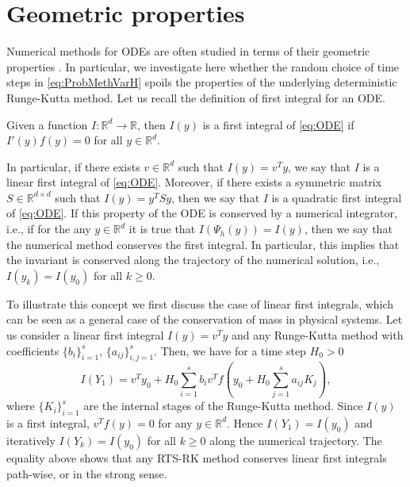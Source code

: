 \documentclass{siamart1116}
\numberwithin{theorem}{section}
\newcommand{\R}{\mathbb{R}}
\newcommand{\sksum}{{\textstyle\sum}}
\newcommand{\corr}[1]{{\color{bordeaux}#1}}
\begin{document}
\section{Geometric properties}\label{sec:GeomProperties}
Numerical methods for ODEs are often studied in terms of their geometric properties \cite{HLW06}. In particular, we investigate here whether the random choice of time steps in \eqref{eq:ProbMethVarH} spoils the properties of the underlying deterministic Runge-Kutta method. Let us recall the definition of first integral for an ODE.
\begin{definition} Given a function $I\colon\R^d\to\R$, then $I(y)$ is a first integral of \eqref{eq:ODE} if $I'(y)f(y) = 0$ for all $y \in \R^d$. 
\end{definition}	
\corr{In particular, if there exists $v \in \R^d$ such that $I(y) = v^Ty$, we say that $I$ is a linear first integral of \eqref{eq:ODE}. Moreover, if there exists a symmetric matrix $S \in \R^{d\times d}$ such that $I(y) = y^TSy$, then we say that $I$ is a quadratic first integral of \eqref{eq:ODE}.} If this property of the ODE is conserved by a numerical integrator, i.e., if for the any $y\in\R^d$ it is true that $I(\Psi_h(y)) = I(y)$, then we say that the numerical method conserves the first integral. In particular, this implies that the invariant is conserved along the trajectory of the numerical solution, i.e., $I(y_k) = I(y_0)$ for all $k\geq 0$.
	
\corr{\begin{example} To illustrate this concept we first discuss the case of linear first integrals, which can be seen as a general case of the conservation of mass in physical systems. Let us consider a linear first integral $I(y) = v^T y$ and any Runge-Kutta method with coefficients $\{b_i\}_{i=1}^s$, $\{a_{ij}\}_{i,j=1}^s$. Then, we have for a time step $H_0 > 0$
	\begin{equation}
		I(Y_1) = v^T y_0 + H_0 \sksum_{i=1}^s b_iv^T f(y_0 + H_0\sksum_{j=1}^{s} a_{ij}K_j),
	\end{equation}
	where $\{K_i\}_{i=1}^s$ are the internal stages of the Runge-Kutta method. Since $I(y)$ is a first integral, $v^T f(y) = 0$ for any $y \in \R^d$. Hence $I(Y_1)  = I(y_0)$ and iteratively $I(Y_k) = I(y_0)$ for all $k \geq 0$ along the numerical trajectory. The equality above shows that any RTS-RK method conserves linear first integrals path-wise, or in the strong sense. 
\end{example}}
\end{document}
